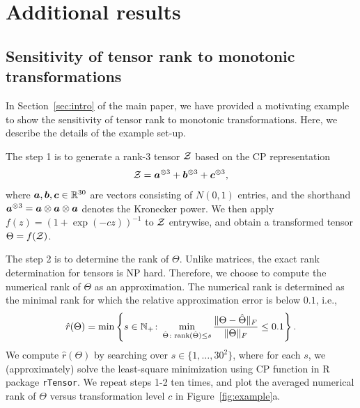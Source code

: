 \documentclass[11pt]{article}
\theoremstyle{plain}
\theoremstyle{definition}
\def\rank{\textup{rank}}
\begin{document}
\section{Additional results}\label{sec:additional}
\subsection{Sensitivity of tensor rank to monotonic transformations}\label{sec:numericalrank}
In Section~\ref{sec:intro} of the main paper, we have provided a motivating example to show the sensitivity of tensor rank to monotonic transformations. Here, we describe the details of the example set-up. 

The step 1 is to generate a rank-3 tensor $\mathcal{Z}$ based on the CP representation
\[
\mathcal{Z}=\bm{a}^{\otimes 3}+\bm{b}^{\otimes 3}+\bm{c}^{\otimes 3},
\]
where $\bm{a},\bm{b},\bm{c}\in\mathbb{R}^{30}$ are vectors consisting of $N(0,1)$ entries, and the shorthand $\bm{a}^{\otimes 3}=\bm{a}\otimes \bm{a}\otimes \bm{a}$ denotes the Kronecker power. We then apply $f(z)=(1+\exp(-cz))^{-1}$ to $\mathcal{Z}$ entrywise, and obtain a transformed tensor $\Theta=f(\mathcal{Z})$. 

The step 2 is to determine the rank of $\Theta$. Unlike matrices, the exact rank determination for tensors is NP hard. Therefore, we choose to compute the numerical rank of $\Theta$ as an approximation.  The numerical rank is determined as the minimal rank for which the relative approximation error is below $0.1$, i.e.,
\begin{equation}\label{eq:numeric}
 \hat r(\Theta)=\min\left\{s\in\mathbb{N}_{+}\colon \min_{\hat \Theta\colon \rank(\hat \Theta)\leq s}{\FnormSize{}{\Theta-\hat \Theta}\over \FnormSize{}{\Theta}} \leq 0.1\right\}.
\end{equation}
We compute $\hat r(\Theta)$ by searching over $s\in\{1,\ldots,30^2\}$, where for each $s$, we (approximately) solve the least-square minimization using CP function in R package {\tt rTensor}. 
We repeat steps 1-2 ten times, and plot the averaged numerical rank of $\Theta$ versus transformation level $c$ in Figure~\ref{fig:example}a.  
\end{document}
